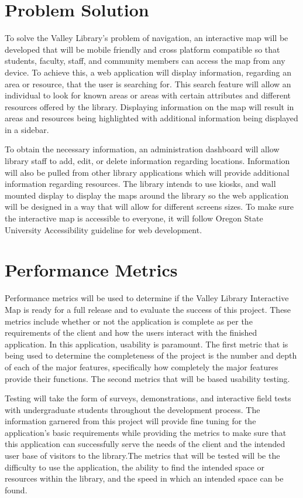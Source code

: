 \documentclass[letterpaper,10pt,titlepage]{article}
\begin{document}
\section*{Problem Solution}
To solve the Valley Library’s problem of navigation, an interactive map will be developed that will be mobile friendly and cross platform compatible so that students, faculty, staff, and community members can access the map from any device. To achieve this, a web application will display information, regarding an area or resource, that the user is searching for. This search feature will allow an individual to look for known areas or areas with certain attributes and different resources offered by the library. Displaying information on the map will result in areas and resources being highlighted with additional information being displayed in a sidebar. 

To obtain the necessary information, an administration dashboard will allow library staff to add, edit, or delete information regarding locations. Information will also be pulled from other library applications which will provide additional information regarding resources. The library intends to use kiosks, and wall mounted display to display the maps around the library so the web application will be designed in a way that will allow for different screens sizes. To make sure the interactive map is accessible to everyone, it will follow Oregon State University Accessibility guideline for web development. 

\section*{Performance Metrics}
Performance metrics will be used to determine if the Valley Library Interactive Map is ready for a full release and to evaluate the success of this project. These metrics include whether or not the application is complete as per the requirements of the client and how the users interact with the finished application.  In this application, usability is paramount. The first metric that is being used to determine the completeness of the project is the number and depth of each of the major features, specifically how completely the major features provide their functions. The second metrics that will be based usability testing. 

Testing will take the form of surveys, demonstrations, and interactive field tests with undergraduate students throughout the development process. The information garnered from this project will provide fine tuning for the application’s basic requirements while providing the metrics to make sure that this application can successfully serve the needs of the client and the intended user base of visitors to the library.The metrics that will be tested will be the difficulty to use the application, the ability to find the intended space or resources within the library, and the speed in which an intended space can be found.
\end{document}
